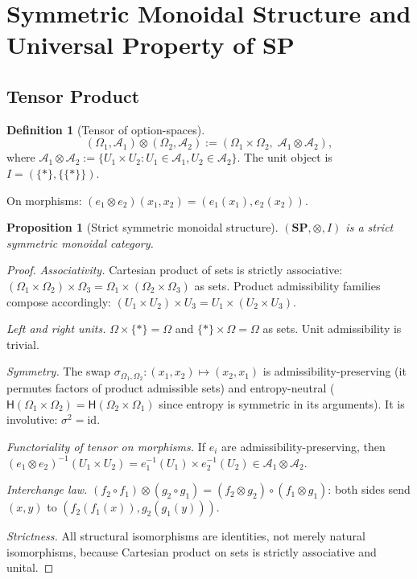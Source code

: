 \documentclass[12pt,a4paper]{article}
\newtheorem{proposition}[theorem]{Proposition}
\theoremstyle{definition}
\newtheorem{definition}[theorem]{Definition}
\theoremstyle{remark}
\newcommand{\Ent}{\mathsf{H}}
\newcommand{\SP}{\mathbf{SP}}
\newcommand{\id}{\mathrm{id}}
\newcommand{\tensor}{\otimes}
\newcommand{\unit}{I}
\begin{document}
\section{Symmetric Monoidal Structure and Universal Property of \texorpdfstring{$\SP$}{SP}}
\label{sec:monoidal}

\subsection{Tensor Product}

\begin{definition}[Tensor of option-spaces]
\label{def:tensor}
\[
  (\Omega_1,\mathcal{A}_1)\tensor(\Omega_2,\mathcal{A}_2)
  := (\Omega_1\times\Omega_2,\;\mathcal{A}_1\tensor\mathcal{A}_2),
\]
where $\mathcal{A}_1\tensor\mathcal{A}_2:=\{U_1\times U_2:U_1\in\mathcal{A}_1,
U_2\in\mathcal{A}_2\}$. The unit object is $\unit=(\{*\},\{\{*\}\})$.

On morphisms: $(e_1\tensor e_2)(x_1,x_2)=(e_1(x_1),e_2(x_2))$.
\end{definition}

\begin{proposition}[Strict symmetric monoidal structure]
\label{prop:monoidal}
$(\SP,\tensor,\unit)$ is a strict symmetric monoidal category.
\end{proposition}

\begin{proof}
\textit{Associativity.} Cartesian product of sets is strictly associative:
$(\Omega_1\times\Omega_2)\times\Omega_3=\Omega_1\times(\Omega_2\times\Omega_3)$
as sets. Product admissibility families compose accordingly: $(U_1\times U_2)\times U_3
=U_1\times(U_2\times U_3)$.

\textit{Left and right units.} $\Omega\times\{*\}=\Omega$ and $\{*\}\times\Omega=\Omega$
as sets. Unit admissibility is trivial.

\textit{Symmetry.} The swap $\sigma_{\Omega_1,\Omega_2}:(x_1,x_2)\mapsto(x_2,x_1)$
is admissibility-preserving (it permutes factors of product admissible sets) and
entropy-neutral ($\Ent(\Omega_1\times\Omega_2)=\Ent(\Omega_2\times\Omega_1)$ since
entropy is symmetric in its arguments). It is involutive: $\sigma^2=\id$.

\textit{Functoriality of tensor on morphisms.} If $e_i$ are admissibility-preserving,
then $(e_1\tensor e_2)^{-1}(U_1\times U_2)=e_1^{-1}(U_1)\times e_2^{-1}(U_2)\in
\mathcal{A}_1\tensor\mathcal{A}_2$.

\textit{Interchange law.} $(f_2\circ f_1)\tensor(g_2\circ g_1)=(f_2\tensor g_2)\circ
(f_1\tensor g_1)$: both sides send $(x,y)$ to $(f_2(f_1(x)),g_2(g_1(y)))$.

\textit{Strictness.} All structural isomorphisms are identities, not merely natural
isomorphisms, because Cartesian product on sets is strictly associative and unital.
\end{proof}
\end{document}
